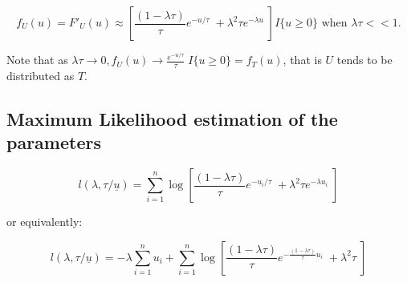 \documentclass[11pt,A4paper]{article}
\begin{document}
\[
f_U(u) = F'_U(u) \approx \left[ \frac{(1 - \lambda \tau)}{\tau} e^{-u/\tau} \; + \lambda^2 \tau e^{-\lambda u} \; \right] I\{u \geq 0\}
\textrm{ when } \lambda \tau << 1.
\]

Note that as $\lambda \tau \to 0, f_U(u) \to \frac{e^{-u/\tau}}{\tau} \; I\{u \geq 0\} = f_T(u)$, that is $U$ tends to be distributed as $T$.

\subsection{Maximum Likelihood estimation of the parameters}
\[
l(\lambda, \tau / \underline{u}) = \sum_{i=1}^{n} \log \left[ \frac{(1 - \lambda \tau)}{\tau} e^{-u_i/\tau} \; + \lambda^2 \tau e^{-\lambda u_i} \; \right]
\]

or equivalently:

\[
l(\lambda, \tau / \underline{u}) = -\lambda \sum_{i=1}^{n} u_i + 
											\sum_{i=1}^{n} {\log \left[ \frac{(1 - \lambda \tau)}{\tau} e^{-\frac{(1 - \lambda \tau)}{\tau} u_i} \; + \lambda^2 \tau \; \right]}
\]

\fi
\end{document}

